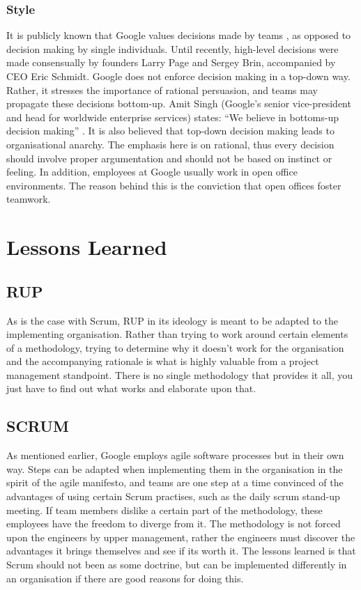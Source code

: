 \subsubsection{Style}
It is publicly known that Google values decisions made by teams \citep{ORGAN15:online}, as opposed to decision making by single individuals.
Until recently, high-level decisions were made consensually by founders Larry Page and Sergey Brin, accompanied by CEO Eric Schmidt.
Google does not enforce decision making in a top-down way.
Rather, it stresses the importance of rational persuasion, and teams may propagate these decisions bottom-up.
Amit Singh (Google's senior vice-president and head for worldwide enterprise services) states: ``We believe in bottoms-up decision making'' \citep{Googl11:online}.
It is also believed that top-down decision making leads to organisational anarchy.
The emphasis here is on rational, thus every decision should involve proper argumentation and should not be based on instinct or feeling.
In addition, employees at Google usually work in open office environments.
The reason behind this is the conviction that open offices foster teamwork.


\section{Lessons Learned}

\subsection{RUP}
As is the case with Scrum, RUP in its ideology is meant to be adapted to the implementing organisation.
Rather than trying to work around certain elements of a methodology, trying to determine why it doesn't work for the organisation and the accompanying rationale is what is highly valuable from a project management standpoint.
There is no single methodology that provides it all, you just have to find out what works and elaborate upon that.

\subsection{SCRUM}
As mentioned earlier, Google employs agile software processes but in their own way.
Steps can be adapted when implementing them in the organisation in the spirit of the agile manifesto, and teams are one step at a time convinced of the advantages of using certain Scrum practises, such as the daily scrum stand-up meeting.
If team members dislike a certain part of the methodology, these employees have the freedom to diverge from it.
The methodology is not forced upon the engineers by upper management, rather the engineers must discover the advantages it brings themselves and see if its worth it.
The lessons learned is that Scrum should not been as some doctrine, but can be implemented differently in an organisation if there are good reasons for doing this.

